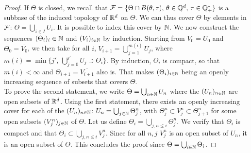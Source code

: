 \begin{proof}
    If $\Theta$ is closed, %
    we recall that $\mathcal{F}=\{\Theta\cap B(\theta,\tau),\,\theta\in\mathbb{Q}^d,\,\tau\in\mathbb{Q}^\ast_+\} $ is a subbase  of the induced topology of $\mathbb{R}^d$ on $\Theta$.
    We can thus cover $\Theta$ by elements in $\mathcal{F}$:
    $\Theta=\bigcup_{i\in I}U_i$. It is possible to index this cover by $\mathbb{N}$. We  now construct the sequences $(\Theta_i)_i\in\mathbb{N}$ and $(V_i)_{i\in\mathbb{N}}$ by induction. Starting from $V_0=U_0$ and $\Theta_0=\overline{V_0}$, we then take for all $i$, $V_{i+1}=\bigcup_{j=1}^{m(i)}U_j $, where $m(i) = \min\{j',\, \bigcup_{j=0}^{j'}U_j \supset {\Theta_i} \}$. %
    By induction, ${\Theta_i}$ is compact, so that $m(i)<\infty$ and $\Theta_{i+1}=\overline{V_{i+1}}$ also is.
That makes $(\Theta_i)_{i\in\mathbb{N}}$ being an openly increasing sequence of subsets that covers $\Theta$.\\

    To prove the second statement, we write $\Theta=\bigcup_{n\in\mathbb{N}} U_n$ where the $(U_n)_{n\in\mathbb{N}}$ are open subsets of $\mathbb{R}^d$.
    Using the first statement, there exists an openly increasing cover for each of the $(U_n)_{n\in\mathbb{N}}$: $U_n=\bigcup_{j\in\mathbb{N}}\Theta_j^n$, with $\Theta_j^n\subset V_j^n\subset\Theta_{j+1}^n$ for some open subsets $(V_j^n)_{j\in\mathbb{N}}$ of $\Theta$.
    Let us define $\Theta_i=\bigcup_{j,n\leq i}\Theta_j^n$. 
    We verify that $\Theta_i$ is compact and that $\Theta_i\subset\bigcup_{j,n\leq i}V_j^n $. Since for all $n,j$ $V_j^n$ is an open subset of $U_n$, it is an open subset of $\Theta$. This concludes the proof since $\Theta=\bigcup_{i\in\mathbb{N}}\Theta_i$.
\end{proof}

